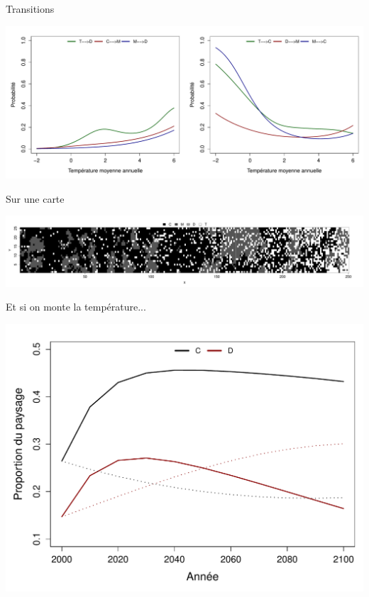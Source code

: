 \documentclass{eecslides}
\begin{document}

	\begin{frame}{Transitions}
		\begin{center}
			\includegraphics[height=0.5\textheight]{Transitions}
		\end{center}
	\end{frame}


	\begin{frame}{Sur une carte}
		\begin{center}
			\includegraphics[height=0.25\textheight]{largeplot}
		\end{center}
	\end{frame}



	\begin{frame}{Et si on monte la température...}
		\begin{center}
			\includegraphics[height=0.6\textheight]{CC_MF}
		\end{center}
	\end{frame}
\end{document}
